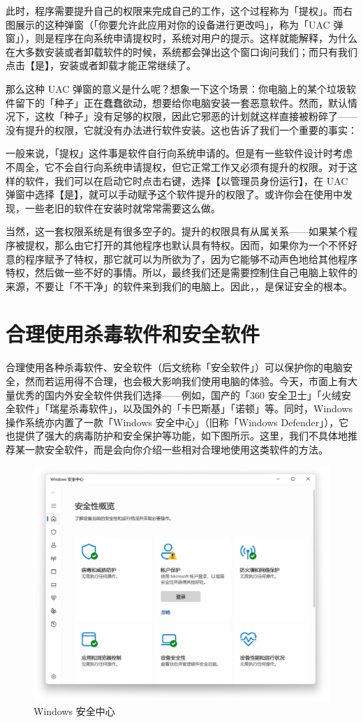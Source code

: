 此时，程序需要提升自己的权限来完成自己的工作，这个过程称为「提权」。而右图展示的这种弹窗（「你要允许此应用对你的设备进行更改吗」，称为「UAC 弹窗」），则是程序在向系统申请提权时，系统对用户的提示。这样就能解释，为什么在大多数安装或者卸载软件的时候，系统都会弹出这个窗口询问我们；而只有我们点击【是】，安装或者卸载才能正常继续了。

那么这种 UAC 弹窗的意义是什么呢？想象一下这个场景：你电脑上的某个垃圾软件留下的「种子」正在蠢蠢欲动，想要给你电脑安装一套恶意软件。然而，默认情况下，这枚「种子」没有足够的权限，因此它邪恶的计划就这样直接被粉碎了——没有提升的权限，它就没有办法进行软件安装。这也告诉了我们一个重要的事实：

一般来说，「提权」这件事是软件自行向系统申请的。但是有一些软件设计时考虑不周全，它不会自行向系统申请提权，但它正常工作又必须有提升的权限。对于这样的软件，我们可以在启动它时点击右键，选择【以管理员身份运行】，在 UAC 弹窗中选择【是】，就可以手动赋予这个软件提升的权限了。或许你会在使用中发现，一些老旧的软件在安装时就常常需要这么做。

当然，这一套权限系统是有很多空子的。提升的权限具有从属关系——如果某个程序被提权，那么由它打开的其他程序也默认具有特权。因而，如果你为一个不怀好意的程序赋予了特权，那它就可以为所欲为了，因为它能够不动声色地给其他程序特权，然后做一些不好的事情。所以，最终我们还是需要控制住自己电脑上软件的来源，不要让「不干净」的软件来到我们的电脑上。因此，，是保证安全的根本。

\section{合理使用杀毒软件和安全软件}

合理使用各种杀毒软件、安全软件（后文统称「安全软件」）可以保护你的电脑安全，然而若运用得不合理，也会极大影响我们使用电脑的体验。今天，市面上有大量优秀的国内外安全软件供我们选择——例如，国产的「360 安全卫士」「火绒安全软件」「瑞星杀毒软件」，以及国外的「卡巴斯基」「诺顿」等。同时，Windows 操作系统亦内置了一款「Windows 安全中心」（旧称「Windows Defender」），它也提供了强大的病毒防护和安全保护等功能，如下图所示。这里，我们不具体地推荐某一款安全软件，而是会向你介绍一些相对合理地使用这类软件的方法。

\begin{figure}[htb!]
  \centering
  \includegraphics[width=.64\textwidth]{assets/basic/Windows_Security.png}
  \caption{Windows 安全中心}
  \label{fig:Windows_Security}
\end{figure}

